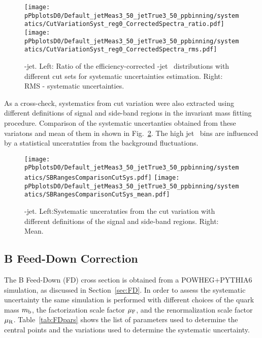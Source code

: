\begin{figure}[bth]
\begin{center}
\texttt{[image: pPbplotsD0/Default\_jetMeas3\_50\_jetTrue3\_50\_ppbinning/systematics/CutVariationSyst\_reg0\_CorrectedSpectra\_ratio.pdf]}
\texttt{[image: pPbplotsD0/Default\_jetMeas3\_50\_jetTrue3\_50\_ppbinning/systematics/CutVariationSyst\_reg0\_CorrectedSpectra\_rms.pdf]}
\caption{\Dzero-jet. Left: Ratio of the efficiency-corrected \Dstar-jet \pt\ distributions with different cut sets for systematic uncertainties estimation. Right: RMS - systematic uncertainties.} 
\label{fig:JetPtSys_Dzero}
\end{center}
\end{figure}


As a cross-check, systematics from cut variation were also extracted using different definitions of signal and side-band regions in the invariant mass fitting procedure. Comparison of the systematic uncertanties obtained from these variatons and mean of them in shown in Fig.~\ref{fig:JetPtSys_Dzero_SB}. The high jet \pt\ bins are influenced by a statistical unceratnties from the background fluctuations. 

\begin{figure}[bth]
\begin{center}
\texttt{[image: pPbplotsD0/Default\_jetMeas3\_50\_jetTrue3\_50\_ppbinning/systematics/SBRangesComparisonCutSys.pdf]}
\texttt{[image: pPbplotsD0/Default\_jetMeas3\_50\_jetTrue3\_50\_ppbinning/systematics/SBRangesComparisonCutSys\_mean.pdf]}
\caption{\Dzero-jet. Left:Systematic unceratnties from the cut variation with different definitions of the signal and side-band regions. Right: Mean.} 
\label{fig:JetPtSys_Dzero_SB}
\end{center}
\end{figure}

\subsection{B Feed-Down Correction}

The B Feed-Down (FD) cross section is obtained from a POWHEG+PYTHIA6 simulation, as discussed in Section~\ref{sec:FD}.
In order to assess the systematic uncertainty the same simulation is performed with different choices of the quark mass $m_{\rm b}$, the factorization scale factor $\mu_{\rm F}$, and the renormalization scale factor $\mu_{\rm R}$.
Table~\ref{tab:FDpars} shows the list of parameters used to determine the central points and the variations used to determine the systematic uncertainty.


